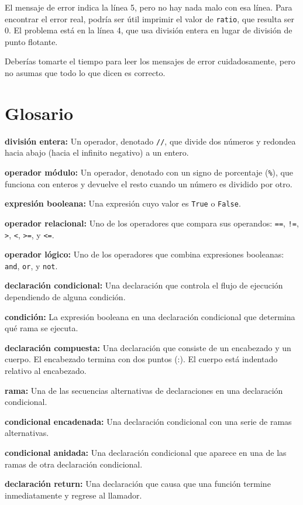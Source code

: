 El mensaje de error indica la línea 5, pero no hay nada malo con esa línea. Para encontrar el error real, podría ser útil imprimir el valor de \texttt{ratio}, que resulta ser 0. El problema está en la línea 4, que usa división entera en lugar de división de punto flotante.

Deberías tomarte el tiempo para leer los mensajes de error cuidadosamente, pero no asumas que todo lo que dicen es correcto.

\section{Glosario}

\textbf{división entera:} Un operador, denotado \texttt{//}, que divide dos números y redondea hacia abajo (hacia el infinito negativo) a un entero.

\textbf{operador módulo:} Un operador, denotado con un signo de porcentaje (\texttt{\%}), que funciona con enteros y devuelve el resto cuando un número es dividido por otro.

\textbf{expresión booleana:} Una expresión cuyo valor es \texttt{True} o \texttt{False}.

\textbf{operador relacional:} Uno de los operadores que compara sus operandos: \texttt{==}, \texttt{!=}, \texttt{>}, \texttt{<}, \texttt{>=}, y \texttt{<=}.

\textbf{operador lógico:} Uno de los operadores que combina expresiones booleanas: \texttt{and}, \texttt{or}, y \texttt{not}.

\textbf{declaración condicional:} Una declaración que controla el flujo de ejecución dependiendo de alguna condición.

\textbf{condición:} La expresión booleana en una declaración condicional que determina qué rama se ejecuta.

\textbf{declaración compuesta:} Una declaración que consiste de un encabezado y un cuerpo. El encabezado termina con dos puntos (:). El cuerpo está indentado relativo al encabezado.

\textbf{rama:} Una de las secuencias alternativas de declaraciones en una declaración condicional.

\textbf{condicional encadenada:} Una declaración condicional con una serie de ramas alternativas.

\textbf{condicional anidada:} Una declaración condicional que aparece en una de las ramas de otra declaración condicional.

\textbf{declaración return:} Una declaración que causa que una función termine inmediatamente y regrese al llamador.

